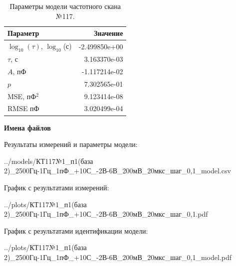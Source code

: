 \begin{table}[!ht]
    \centering
    \caption{Параметры модели частотного скана №117.}
    \begin{tabular}{|l|r|}
        \hline
        Параметр                                       & Значение                  \\ \hline
        $\log_{10}(\tau)$, $\log_{10}$(с)              & -2.499850e+00             \\ \hline
        $\tau$, с                                      & 3.163370e-03              \\ \hline
        $A$, пФ                                        & -1.117214e-02             \\ \hline
        $p$                                            & 7.302565e-01              \\ \hline
        MSE, пФ$^2$                                    & 9.123414e-08              \\ \hline
        RMSE пФ                                        & 3.020499e-04              \\ \hline
    \end{tabular}
    \label{table:frequency_scan_model_117}
\end{table}

\textbf{Имена файлов}

Результаты измерений и параметры модели:

\scriptsize../models/КТ117№1\_п1(база 2)\_2500Гц-1Гц\_1пФ\_+10С\_-2В-6В\_200мВ\_20мкс\_шаг\_0,1\_model.csv
\normalsize

График с результатами измерений:

\scriptsize../plots/КТ117№1\_п1(база 2)\_2500Гц-1Гц\_1пФ\_+10С\_-2В-6В\_200мВ\_20мкс\_шаг\_0,1.pdf
\normalsize

График с результатами идентификации модели:

\scriptsize../plots/КТ117№1\_п1(база 2)\_2500Гц-1Гц\_1пФ\_+10С\_-2В-6В\_200мВ\_20мкс\_шаг\_0,1\_model.pdf
\normalsize


